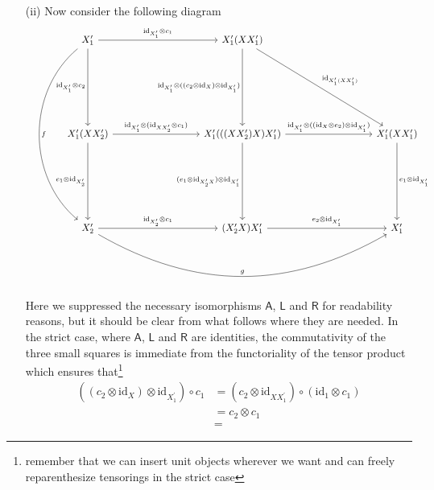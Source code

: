 \begin{prf}
\begin{enumerate}
\item[(ii)]
Now consider the following diagram
\begin{equation}
\label{dualuniquestrict}
\begin{tikzcd}[row sep=8em,column sep=9em]
  X_{1}^{\prime}
  \ar{r}{\mathrm{id}_{X_{1}^{\prime}} \otimes c_{1}}
  \ar{d}[swap]{\mathrm{id}_{X_{1}^{\prime}} \otimes c_{2}}
  \ar[bend right=50]{dd}{f}
  &
  X_{1}^{\prime} (X X_{1}^{\prime})
  \ar{rd}{\mathrm{id}_{X_{1}^{\prime} (X X_{1}^{\prime})}}
  \ar{d}[swap]{\mathrm{id}_{X_{1}^{\prime}} \otimes ((c_{2} \otimes \mathrm{id}_{X}) \otimes \mathrm{id}_{X_{1}^{\prime}})}
  &
  \\
  X_{1}^{\prime} (X X_{2}^{\prime})
  \ar{r}{\mathrm{id}_{X_{1}^{\prime}} \otimes (\mathrm{id}_{X X_{2}^{\prime}} \otimes c_{1})}
  \ar{d}[swap]{e_{1} \otimes \mathrm{id}_{X_{2}^{\prime}}}
  &
  X_{1}^{\prime} (((X X_{2}^{\prime}) X) X_{1}^{\prime})
  \ar{r}{\mathrm{id}_{X_{1}^{\prime}} \otimes ((\mathrm{id}_{X} \otimes e_{2}) \otimes \mathrm{id}_{X_{1}^{\prime}})}
  \ar{d}[swap]{(e_{1} \otimes \mathrm{id}_{X_{2}^{\prime} X}) \otimes \mathrm{id}_{X_{1}^{\prime}}}
  &
  X_{1}^{\prime} (X X_{1}^{\prime})
  \ar{d}{e_{1} \otimes \mathrm{id}_{X_{1}^{\prime}}}
  \\
  X_{2}^{\prime}
  \ar{r}{\mathrm{id}_{X_{2}^{\prime}} \otimes c_{1}}
  \ar[bend right]{rr}{g}
  &
  (X_{2}^{\prime} X) X_{1}^{\prime}
  \ar{r}{e_{2} \otimes \mathrm{id}_{X_{1}^{\prime}}}
  &
  X_{1}^{\prime}
\end{tikzcd}
\end{equation}
Here we suppressed the necessary isomorphisms $\mathsf{A}$, $\mathsf{L}$ and $\mathsf{R}$ for readability reasons, but it should be clear from what follows where they are needed. In the strict case, where $\mathsf{A}$, $\mathsf{L}$ and $\mathsf{R}$ are identities, the commutativity of the three small squares is immediate from the functoriality of the tensor product which ensures that\footnote{remember that we can insert unit objects wherever we want and can freely reparenthesize tensorings in the strict case}
\begin{align*}
  \left(
    \left(
      c_{2}
      \otimes
      \mathrm{id}_{X}
    \right)
    \otimes
    \mathrm{id}_{X_{1}^{\prime}}
  \right)
  \circ
  c_{1}
  &=
  \left(
    c_{2}
    \otimes
    \mathrm{id}_{X X_{1}^{\prime}}
  \right)
  \circ
  \left(
    \mathrm{id}_{1}
    \otimes
    c_{1}
  \right)
  \\
  &=
  c_{2}
  \otimes
  c_{1}
  \\
  &=

\end{align*}
\end{enumerate}
\end{prf}
